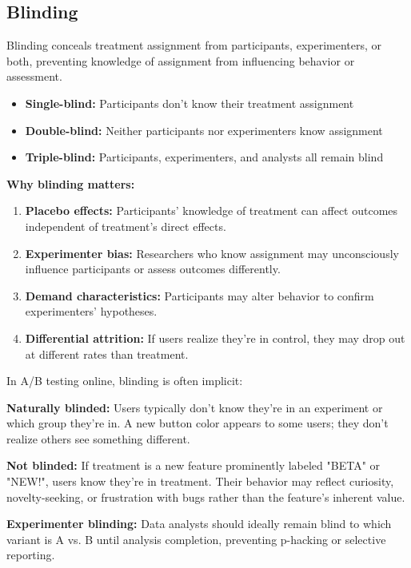 \subsection{Blinding}

Blinding conceals treatment assignment from participants, experimenters, or both, preventing knowledge of assignment from influencing behavior or assessment.

\begin{definition}[Blinding]
\begin{itemize}
    \item \textbf{Single-blind:} Participants don't know their treatment assignment
    \item \textbf{Double-blind:} Neither participants nor experimenters know assignment
    \item \textbf{Triple-blind:} Participants, experimenters, and analysts all remain blind
\end{itemize}
\end{definition}

\textbf{Why blinding matters:}

\begin{enumerate}
    \item \textbf{Placebo effects:} Participants' knowledge of treatment can affect outcomes independent of treatment's direct effects.

    \item \textbf{Experimenter bias:} Researchers who know assignment may unconsciously influence participants or assess outcomes differently.

    \item \textbf{Demand characteristics:} Participants may alter behavior to confirm experimenters' hypotheses.

    \item \textbf{Differential attrition:} If users realize they're in control, they may drop out at different rates than treatment.
\end{enumerate}

\begin{example}
In A/B testing online, blinding is often implicit:

\textbf{Naturally blinded:} Users typically don't know they're in an experiment or which group they're in. A new button color appears to some users; they don't realize others see something different.

\textbf{Not blinded:} If treatment is a new feature prominently labeled "BETA" or "NEW!", users know they're in treatment. Their behavior may reflect curiosity, novelty-seeking, or frustration with bugs rather than the feature's inherent value.

\textbf{Experimenter blinding:} Data analysts should ideally remain blind to which variant is A vs. B until analysis completion, preventing p-hacking or selective reporting.
\end{example}

